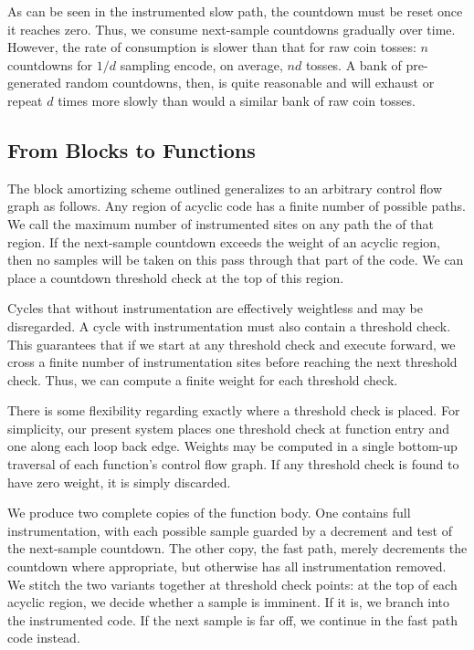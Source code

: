As can be seen in the instrumented slow path, the countdown must be
reset once it reaches zero.  Thus, we consume next-sample countdowns
gradually over time.  However, the rate of consumption is slower than
that for raw coin tosses: $n$ countdowns for $1/d$ sampling encode, on
average, $nd$ tosses.  A bank of pre-generated random countdowns,
then, is quite reasonable and will exhaust or repeat $d$ times more
slowly than would a similar bank of raw coin tosses.

\subsection{From Blocks to Functions}

The block amortizing scheme outlined generalizes to an arbitrary
control flow graph as follows.  Any region of acyclic code has a
finite number of possible paths.  We call the maximum number of
instrumented sites on any path the  of that region.
If the next-sample countdown exceeds the weight of an acyclic region,
then no samples will be taken on this pass through that part of the
code.  We can place a countdown threshold check at the top of this
region.

Cycles that without instrumentation are effectively weightless and may
be disregarded.  A cycle with instrumentation must also contain a
threshold check.  This guarantees that if we start at any threshold
check and execute forward, we cross a finite number of instrumentation
sites before reaching the next threshold check.  Thus, we can compute
a finite weight for each threshold check.

There is some flexibility regarding exactly where a threshold check is
placed.  For simplicity, our present system places one threshold check
at function entry and one along each loop back edge.  Weights may be
computed in a single bottom-up traversal of each function's control
flow graph.  If any threshold check is found to have zero weight, it
is simply discarded.

We produce two complete copies of the function body.  One contains
full instrumentation, with each possible sample guarded by a decrement
and test of the next-sample countdown.  The other copy, the fast path,
merely decrements the countdown where appropriate, but otherwise has
all instrumentation removed.  We stitch the two variants together at
threshold check points: at the top of each acyclic region, we decide
whether a sample is imminent.  If it is, we branch into the
instrumented code.  If the next sample is far off, we continue in the
fast path code instead.

